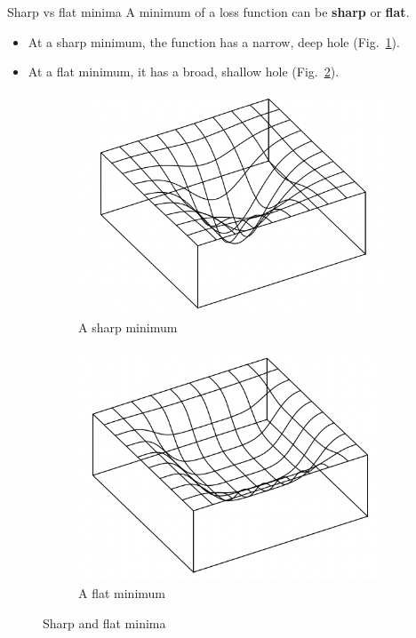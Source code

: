 \documentclass{beamer}
\begin{document}
\begin{frame}{Sharp vs flat minima}
    A minimum of a loss function can be \textbf{sharp} or \textbf{flat}.
    \begin{itemize}
        \item At a sharp minimum, the function has a narrow, deep hole (Fig.~\ref{fig:sharp_minimum}).
        \item At a flat minimum, it has a broad, shallow hole (Fig.~\ref{fig:flat_minimum}).
    \end{itemize}
    
    \begin{figure}
        \centering
        \begin{subfigure}[b]{0.4\textwidth}
            \centering
            \includegraphics[width=\textwidth]{sharp_minimum}
            \caption{A sharp minimum}
            \label{fig:sharp_minimum}
        \end{subfigure}
        \begin{subfigure}[b]{0.4\textwidth}
            \centering
            \includegraphics[width=\textwidth]{flat_minimum}
            \caption{A flat minimum}
            \label{fig:flat_minimum}
        \end{subfigure}
        \caption{Sharp and flat minima}
        \label{fig:sharp_and_flat_minima}
    \end{figure}
\end{frame}
\end{document}
